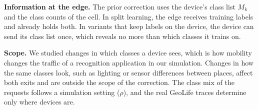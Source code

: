 \textbf{Information at the edge.} The prior correction uses the device's class list $M_k$ and the class counts of the cell. In split learning, the edge receives training labels and already holds both. In variants that keep labels on the device, the device can send its class list once, which reveals no more than which classes it trains on.

\textbf{Scope.} We studied changes in which classes a device sees, which is how mobility changes the traffic of a recognition application in our simulation. Changes in how the same classes look, such as lighting or sensor differences between places, affect both exits and are outside the scope of the correction. The class mix of the requests follows a simulation setting ($\rho$), and the real GeoLife traces determine only where devices are.
